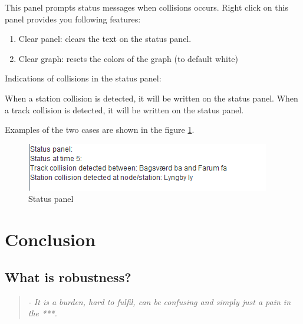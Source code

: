 \documentclass[10pt,a4paper]{article}
\begin{document}
This panel prompts status messages when collisions occurs. Right click on this panel provides you following features:

\begin{enumerate}
  \item Clear panel: clears the text on the status panel.
  \item Clear graph: resets the colors of the graph (to default white)
\end{enumerate} 

Indications of collisions in the status panel:
 
When a station collision is detected, it will be written on the status panel.
When a track collision is detected, it will be written on the status panel.
 
Examples of the two cases are shown in the figure \ref{fig:status panel}.

\begin{figure}[h]
\centering
\includegraphics[scale=0.7]{fig/status.png}
 \caption{Status panel}
 \label{fig:status panel}
\end{figure}

\section{Conclusion}
\subsection{What is robustness?}
\begin{quote}
\textit{- It is a burden, hard to fulfil, can be confusing and simply just a pain in the ***.}
\end{quote}
\end{document}
